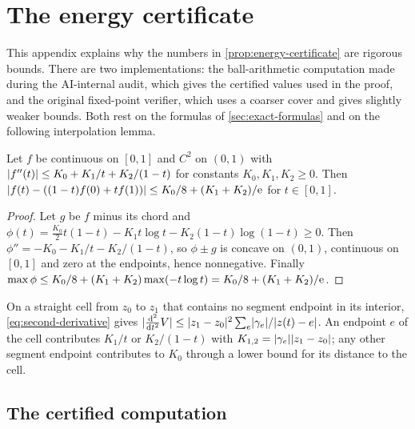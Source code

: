 \section{The energy certificate}\label{sec:error-analysis}

This appendix explains why the numbers in \cref{prop:energy-certificate} are rigorous bounds.
There are two implementations: the ball-arithmetic computation made during the AI-internal
audit, which gives the certified values used in the proof, and the original fixed-point verifier, which
uses a coarser cover and gives slightly weaker bounds. Both rest on the formulas of
\cref{sec:exact-formulas} and on the following interpolation lemma.

\begin{lemma}\label{lem:chord}
Let $f$ be continuous on $[0,1]$ and $C^2$ on $(0,1)$ with
$\lvert f''(t)\rvert\le K_0+K_1/t+K_2/(1-t)$ for constants $K_0,K_1,K_2\ge0$. Then
$\lvert f(t)-((1-t)f(0)+tf(1))\rvert\le K_0/8+(K_1+K_2)/\mathrm{e}$ for $t\in[0,1]$.
\end{lemma}

\begin{proof}
Let $g$ be $f$ minus its chord and
$\phi(t)=\frac{K_0}2t(1-t)-K_1t\log t-K_2(1-t)\log(1-t)\ge0$. Then $\phi''=-K_0-K_1/t-K_2/(1-t)$,
so $\phi\pm g$ is concave on $(0,1)$, continuous on $[0,1]$ and zero at the endpoints, hence
nonnegative. Finally $\max\phi\le K_0/8+(K_1+K_2)\max(-t\log t)=K_0/8+(K_1+K_2)/\mathrm{e}$.
\end{proof}

On a straight cell from $z_0$ to $z_1$ that contains no segment endpoint in its interior,
\eqref{eq:second-derivative} gives
$\lvert \frac{\mathrm{d}^2}{\mathrm{d} t^2}V\rvert\le\lvert z_1-z_0\rvert^2\sum_e\lvert \gamma_e\rvert/\lvert z(t)-e\rvert$. An endpoint $e$ of
the cell contributes $K_1/t$ or $K_2/(1-t)$ with $K_{1,2}=\lvert \gamma_e\rvert\lvert z_1-z_0\rvert$; any other
segment endpoint contributes to $K_0$ through a lower bound for its distance to the cell.

\subsection{The certified computation}\label{subsec:energy-recomputation}

